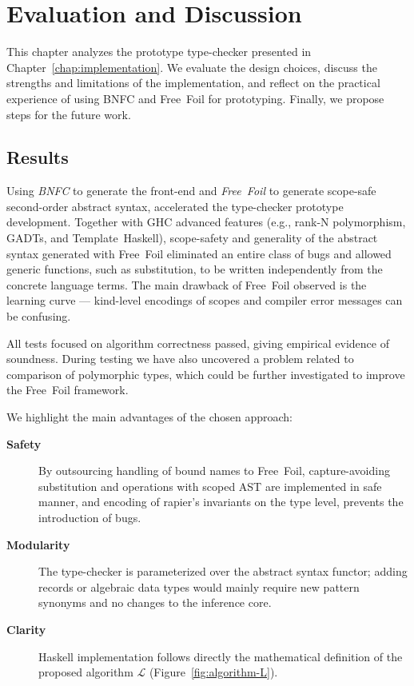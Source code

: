 \chapter{Evaluation and Discussion}
\label{chap:evaluation}

This chapter analyzes the prototype type-checker presented in Chapter~\ref{chap:implementation}. We evaluate the design choices, discuss the strengths and limitations of the implementation, and reflect on the practical experience of using BNFC and Free~Foil for prototyping. Finally, we propose steps for the future work.

\section{Results}

Using \emph{BNFC} to generate the front-end and \emph{Free~Foil} to generate scope-safe second-order abstract syntax, accelerated the type-checker prototype development. Together with GHC advanced features (e.g., rank-N polymorphism, GADTs, and Template~Haskell), scope-safety and generality of the abstract syntax generated with Free~Foil eliminated an entire class of bugs and allowed generic functions, such as substitution, to be written independently from the concrete language terms. The main drawback of Free~Foil observed is the learning curve — kind-level encodings of scopes and compiler error messages can be confusing.

All tests focused on algorithm correctness passed, giving empirical evidence of soundness. During testing we have also uncovered a problem related to comparison of polymorphic types, which could be further investigated to improve the Free~Foil framework.

We highlight the main advantages of the chosen approach:

\begin{description}
  \item[\textbf{Safety}] By outsourcing handling of bound names to Free~Foil, capture-avoiding substitution and operations with scoped AST are implemented in safe manner, and encoding of rapier's invariants on the type level, prevents the introduction of bugs.
  \item[\textbf{Modularity}] The type-checker is parameterized over the abstract syntax functor; adding records or algebraic data types would mainly require new pattern synonyms and no changes to the inference core.
  \item[\textbf{Clarity}] Haskell implementation follows directly the mathematical definition of the proposed algorithm $\mathcal{L}$ (Figure~\ref{fig:algorithm-L}).
\end{description}

